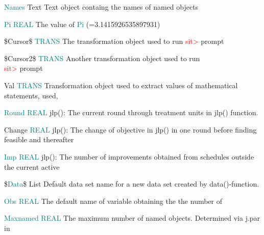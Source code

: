 {\noindent \textcolor{teal}{Names} \tabto{25mm }   Text \tabto{45mm }   Text object containg the names of named objects 
 
 
 
\noindent \textcolor{teal}{Pi} \tabto{25mm }  \textcolor{teal}{REAL} \tabto{45mm }  The value of \textcolor{teal}{Pi} (=3.1415926535897931) 
 
 
 
 
 
 
 
 
 
 
 
 
 
 
\noindent \$Cursor\$ \tabto{25mm }   \textcolor{teal}{TRANS}  \tabto{45mm }   The transformation object used to run \textcolor{Red}{sit>} prompt 
 
 
\noindent \$Cursor2\$ \tabto{25mm }   \textcolor{teal}{TRANS}  \tabto{45mm }   Another transformation object used to run \\ 
\tabto{45mm } \textcolor{Red}{sit>} prompt 
 
\noindent Val \tabto{25mm }  \textcolor{teal}{TRANS} \tabto{45mm }   Transformation object used to extract values of mathematical statements, used, 
 
 
\noindent \textcolor{teal}{Round}  \tabto{25mm }  \textcolor{teal}{REAL} \tabto{45mm }   \textcolor{VioletRed}{jlp}(): The current round through treatment units in \textcolor{VioletRed}{jlp}() function. 
 
 
\noindent Change \tabto{25mm }  \textcolor{teal}{REAL} \tabto{45mm }   \textcolor{VioletRed}{jlp}(): The change of objective in \textcolor{VioletRed}{jlp}()  in one round before finding feasible and thereafter 
 
 
\noindent \textcolor{teal}{Imp} \tabto{25mm }  \textcolor{teal}{REAL} \tabto{45mm }   \textcolor{VioletRed}{jlp}(): The number of improvements obtained from schedules outside the current active 
 
 
\noindent \$\textcolor{teal}{Data}\$  \tabto{25mm }   List \tabto{45mm }   Default data set name for a new data set created by \textcolor{VioletRed}{data}()-function. 
 
 
 
 
 
\noindent \textcolor{teal}{Obs} \tabto{25mm }   \textcolor{teal}{REAL}  \tabto{45mm }   The default name of variable obtaining the the number of 
 
\noindent \textcolor{teal}{Maxnamed}  \tabto{25mm }  \textcolor{teal}{REAL} \tabto{45mm }   The maximum number of named objects. Determined via j.par in 
 
}
